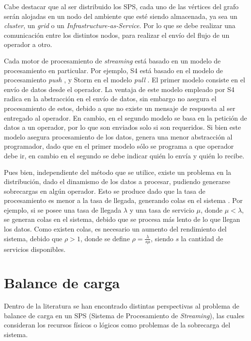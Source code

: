 Cabe destacar que al ser distribuido los SPS, cada uno de las vértices del grafo serán alojadas en un nodo del ambiente que esté siendo almacenada, ya sea un \textit{cluster}, un \textit{grid} o un \textit{Infrastructure-as-Service}. Por lo que se debe realizar una comunicación entre los distintos nodos, para realizar el envío del flujo de un operador a otro.

Cada motor de procesamiento de \textsl{streaming} está basado en un modelo de procesamiento en particular. Por ejemplo, S4 está basado en el modelo de procesamiento \textsl{push} \citep{s4yahoo}, y Storm en el modelo \textsl{pull} \citep{stormtwitter}. El primer modelo consiste en el envío de datos desde el operador. La ventaja de este modelo empleado por S4 radica en la abstracción en el envío de datos, sin embargo no asegura el procesamiento de estos, debido a que no existe un mensaje de respuesta al ser entregado al operador. En cambio, en el segundo modelo se basa en la petición de datos a un operador, por lo que son enviados solo si son requeridos. Si bien este modelo asegura procesamiento de los datos, genera una menor abstracción al programador, dado que en el primer modelo sólo se programa a que operador debe ir, en cambio en el segundo se debe indicar quién lo envía y quién lo recibe.

Pues bien, independiente del método que se utilice, existe un problema en la distribución, dado el dinamismo de los datos a procesar, pudiendo generarse sobrecargas en algún operador. Esto se produce dado que la tasa de procesamiento es menor a la tasa de llegada, generando colas en el sistema \citep{queueingtheory}. Por ejemplo, si se posee una tasa de llegada $\lambda$ y una tasa de servicio $\mu$, donde $\mu < \lambda$, se generan colas en el sistema, debido que se procesa más lento de lo que llegan los datos. Como existen colas, es necesario un aumento del rendimiento del sistema, debido que $\rho > 1 $, donde se define $\rho = \frac{\lambda}{s\mu}$, siendo $s$ la cantidad de servicios disponibles.

\section{Balance de carga}

Dentro de la literatura se han encontrado distintas perspectivas al problema de balance de carga en un SPS (Sistema de Procesamiento de \textsl{Streaming}), las cuales consideran los recursos físicos o lógicos como problemas de la sobrecarga del sistema.

